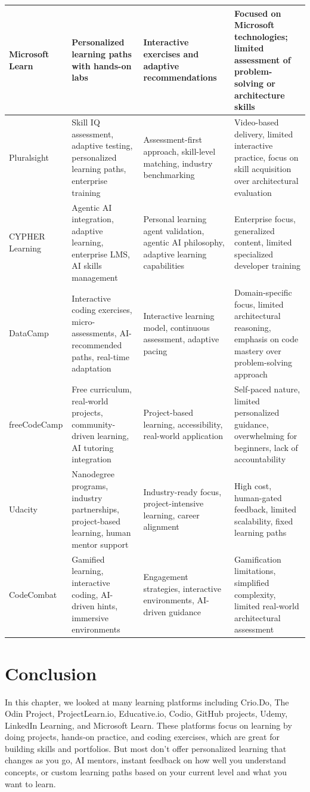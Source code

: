 \documentclass{FastFyp}
\begin{document}
\begin{table}[!htbp]
\begin{tabular}{|p{2.5cm}|p{3.5cm}|p{4cm}|p{4cm}|}
\hline
Microsoft Learn \cite{ref:MicrosoftLearn} & Personalized learning paths with hands-on labs & Interactive exercises and adaptive recommendations & Focused on Microsoft technologies; limited assessment of problem-solving or architecture skills \\
\hline
Pluralsight \cite{pluralsight2023} & Skill IQ assessment, adaptive testing, personalized learning paths, enterprise training & Assessment-first approach, skill-level matching, industry benchmarking & Video-based delivery, limited interactive practice, focus on skill acquisition over architectural evaluation \\
\hline
CYPHER Learning \cite{cypher2023} & Agentic AI integration, adaptive learning, enterprise LMS, AI skills management & Personal learning agent validation, agentic AI philosophy, adaptive learning capabilities & Enterprise focus, generalized content, limited specialized developer training \\
\hline
DataCamp \cite{datacamp2023} & Interactive coding exercises, micro-assessments, AI-recommended paths, real-time adaptation & Interactive learning model, continuous assessment, adaptive pacing & Domain-specific focus, limited architectural reasoning, emphasis on code mastery over problem-solving approach \\
\hline
freeCodeCamp \cite{freecodecamp2023} & Free curriculum, real-world projects, community-driven learning, AI tutoring integration & Project-based learning, accessibility, real-world application & Self-paced nature, limited personalized guidance, overwhelming for beginners, lack of accountability \\
\hline
Udacity \cite{udacity2023} & Nanodegree programs, industry partnerships, project-based learning, human mentor support & Industry-ready focus, project-intensive learning, career alignment & High cost, human-gated feedback, limited scalability, fixed learning paths \\
\hline
CodeCombat \cite{codecombat2023} & Gamified learning, interactive coding, AI-driven hints, immersive environments & Engagement strategies, interactive environments, AI-driven guidance & Gamification limitations, simplified complexity, limited real-world architectural assessment \\
\hline
\end{tabular}
\end{table}

\FloatBarrier


\section{Conclusion}
In this chapter, we looked at many learning platforms including Crio.Do, The Odin Project, ProjectLearn.io, Educative.io, Codio, GitHub projects, Udemy, LinkedIn Learning, and Microsoft Learn. These platforms focus on learning by doing projects, hands-on practice, and coding exercises, which are great for building skills and portfolios. But most don't offer personalized learning that changes as you go, AI mentors, instant feedback on how well you understand concepts, or custom learning paths based on your current level and what you want to learn.
\end{document}
